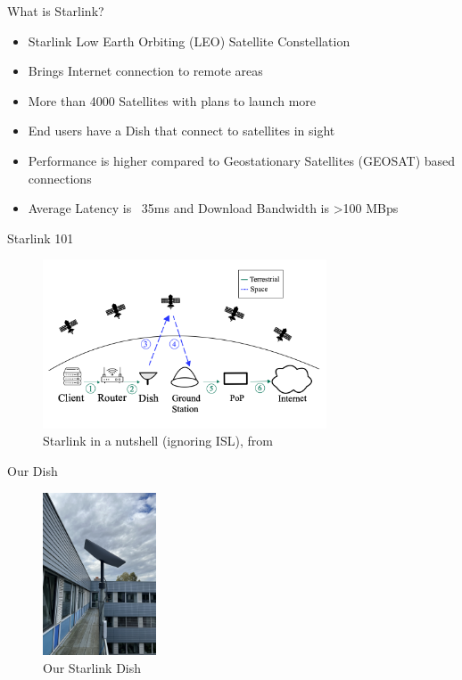 \documentclass[NET,english,beameralt]{tumbeamer}
\begin{document}
\begin{frame}{What is Starlink?}
	\begin{itemize}
		\item Starlink Low Earth Orbiting (LEO) Satellite Constellation
		\item Brings Internet connection to remote areas 
		\item More than 4000 Satellites with plans to launch more
		\item End users have a Dish that connect to satellites in sight
		\item Performance is higher compared to Geostationary Satellites (GEOSAT) based connections
		\item Average Latency is ~35ms and Download Bandwidth is >100 MBps
	\end{itemize}
\end{frame}

\begin{frame}{Starlink 101}
	\begin{figure}
    	\includegraphics[width=0.75\textwidth]{pics/starlink-101.png}
    	\caption{Starlink in a nutshell (ignoring ISL), from \cite{izhikevich2023democratizing}}
	\end{figure}
\end{frame}

\begin{frame}{Our Dish}
	\begin{figure}
    	\includegraphics[width=0.3\textwidth]{pics/dish.jpeg}
    	\caption{Our Starlink Dish}
	\end{figure}
\end{frame}
\end{document}
